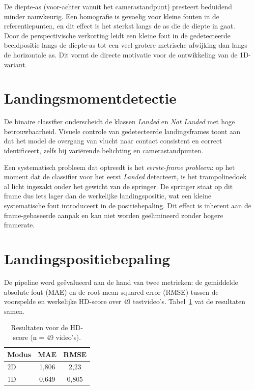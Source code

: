 De diepte-as (voor-achter vanuit het camerastandpunt) presteert beduidend minder nauwkeurig. Een homografie is gevoelig voor kleine fouten in de referentiepunten, en dit effect is het sterkst langs de as die de diepte in gaat. Door de perspectivische verkorting leidt een kleine fout in de gedetecteerde beeldpositie langs de diepte-as tot een veel grotere metrische afwijking dan langs de horizontale as. Dit vormt de directe motivatie voor de ontwikkeling van de 1D-variant.


\section{Landingsmomentdetectie}
\label{sec:resultaten-landingsmoment}

De binaire classifier onderscheidt de klassen \textit{Landed} en \textit{Not Landed} met hoge betrouwbaarheid. Visuele controle van gedetecteerde landingsframes toont aan dat het model de overgang van vlucht naar contact consistent en correct identificeert, zelfs bij vari{\"e}rende belichting en camerastandpunten.

Een systematisch probleem dat optreedt is het \textit{eerste-frame probleem}: op het moment dat de classifier voor het eerst \textit{Landed} detecteert, is het trampolinedoek al licht ingezakt onder het gewicht van de springer. De springer staat op dit frame dus iets lager dan de werkelijke landingspositie, wat een kleine systematische fout introduceert in de positiebepaling. Dit effect is inherent aan de frame-gebaseerde aanpak en kan niet worden ge{\"e}limineerd zonder hogere framerate.

\section{Landingspositiebepaling}
\label{sec:resultaten-landingspositie}

De pipeline werd geëvalueerd aan de hand van twee metrieken: de gemiddelde absolute fout (MAE) en de root mean squared error (RMSE) tussen de voorspelde en werkelijke HD-score over 49 testvideo's. Tabel~\ref{tab:hd-resultaten} vat de resultaten samen.

\begin{table}[ht]
    \centering
    \caption{Resultaten voor de HD-score (n = 49 video's).}
    \label{tab:hd-resultaten}
    \begin{tabular}{lcc}
        \toprule
        \textbf{Modus} & \textbf{MAE} & \textbf{RMSE} \\
        \midrule
        2D             & 1,806        & 2,23          \\
        1D             & 0,649        & 0,805         \\
        \bottomrule
    \end{tabular}
\end{table}


